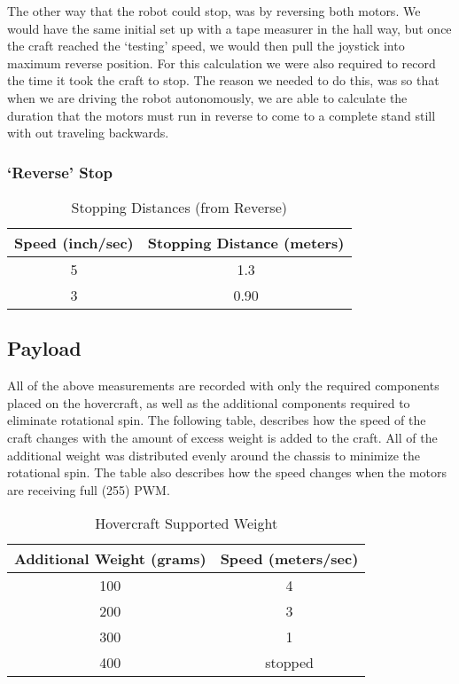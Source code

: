 The other way that the robot could stop, was by reversing both motors. We would have the same initial set up with a tape measurer in the hall way, but once the craft reached the `testing' speed, we would then pull the joystick into maximum reverse position. For this calculation we were also required to record the time it took the craft to stop. The reason we needed to do this, was so that when we are driving the robot autonomously, we are able to calculate the duration that the motors must run in reverse to come to a complete stand still with out traveling backwards.

\subsubsection{`Reverse' Stop}
\begin{table}
\caption{Stopping Distances (from Reverse)}
\begin{center}
\begin{tabular}{ c c }
  Speed (inch/sec) & Stopping Distance (meters) \\
  \hline
  5 & 1.3 \\
  3 & 0.90 \\
\end{tabular}
\end{center}
\label{reverseTable}
\end{table}

\subsection{Payload}
All of the above measurements are recorded with only the required components placed on the hovercraft, as well as the additional components required to eliminate rotational spin. The following table, describes how the speed of the craft changes with the amount of excess weight is added to the craft. All of the additional weight was distributed evenly around the chassis to minimize the rotational spin. The table also describes how the speed changes when the motors are receiving full (255) PWM.
\begin{table}
\caption{Hovercraft Supported Weight}
\begin{center}
\begin{tabular}{ c c }
  Additional Weight (grams) & Speed (meters/sec) \\
  \hline
  100 & 4 \\
  200 & 3 \\
  300 & 1 \\
  400 & stopped \\
\end{tabular}
\end{center}
\label{weightTable}
\end{table}
